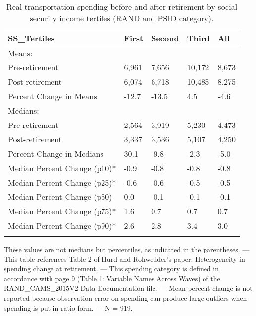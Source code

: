 \begin{table}[tbp] \centering
{}

\caption{Real transportation spending before and after retirement by social security income tertiles (RAND and PSID category).}
\begin{tabularx}{\textwidth}{lCCCC}

\toprule
{SS\_Tertiles}&{First}&{Second}&{Third}&{All} \tabularnewline
\midrule\addlinespace[1.5ex]
Means:&&&& \tabularnewline
\midrule Pre-retirement&6,961&7,656&10,172&8,673 \tabularnewline
Post-retirement&6,074&6,718&10,485&8,275 \tabularnewline
Percent Change in Means&-12.7&-13.5&4.5&-4.6 \tabularnewline
\midrule Medians:&&&& \tabularnewline
\midrule Pre-retirement&2,564&3,919&5,230&4,473 \tabularnewline
Post-retirement&3,337&3,536&5,107&4,250 \tabularnewline
Percent Change in Medians&30.1&-9.8&-2.3&-5.0 \tabularnewline
Median Percent Change (p10)*&-0.9&-0.8&-0.8&-0.8 \tabularnewline
Median Percent Change (p25)*&-0.6&-0.6&-0.5&-0.5 \tabularnewline
Median Percent Change (p50)&0.0&-0.1&-0.1&-0.1 \tabularnewline
Median Percent Change (p75)*&1.6&0.7&0.7&0.7 \tabularnewline
Median Percent Change (p90)*&2.6&2.8&3.4&3.0 \tabularnewline
\bottomrule \addlinespace[1.5ex]

\end{tabularx}
\begin{flushleft}
\footnotesize *These values are not medians but percentiles, as indicated in the parentheses. \linebreak --- \linebreak This table references Table 2 of Hurd and Rohwedder's paper: Heterogeneity in spending change at retirement. \linebreak --- \linebreak This spending category is defined in accordance with page 9 (Table 1: Variable Names Across Waves) of the RAND\_CAMS\_2015V2 Data Documentation file. \linebreak --- \linebreak Mean percent change is not reported because observation error on spending can produce large outliers when spending is put in ratio form. \linebreak --- \linebreak N = 919.
\end{flushleft}
\end{table}
